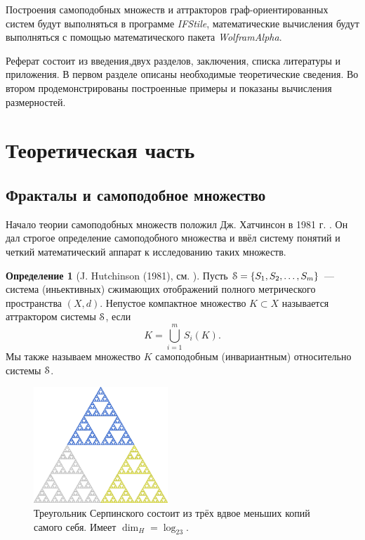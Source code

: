 \documentclass[a4paper,14pt]{extarticle} %
\newcommand{\eS}{\EuScript{S}}
\newcommand{\IN}{\subset}
\newcommand{\0}{\varnothing}
\newcommand{\8}{\infty}
\theoremstyle{definition}
\newtheorem{definition}[theorem]{Определение}
\begin{document}
Построения самоподобных множеств и аттракторов граф-ори\-ен\-ти\-ро\-ван\-ных систем будут выполняться в программе {\em IFStile\/}, математические вычисления будут выполняться с помощью математического пакета {\em WolframAlpha}.

Реферат состоит из введения,двух разделов, заключения, списка литературы и
приложения.
В первом разделе описаны необходимые теоретические сведения.
Во втором продемонстрированы построенные примеры и показаны вычисления размерностей.


\newpage
\section{Теоретическая часть}

\subsection{Фракталы и самоподобное множество}

Начало теории самоподобных множеств положил Дж. Хатчинсон в 1981 г. \cite{Hut1981}.
Он дал строгое определение самоподобного множества и ввёл систему понятий и четкий математический аппарат к исследованию таких множеств. 

\begin{definition}[J. Hutchinson (1981), см. {\cite{Hut1981}}]\label{dfn:sss}
Пусть $\eS=\{S_1, S_2, \ldots, S_m\}$ ---  система (иньективных) сжимающих отображений полного метрического пространства $(X, d)$.
Непустое компактное множество $K\IN X$ называется аттрактором системы $\eS$, если 
$$K = \bigcup \limits_{i=1}^m S_i (K).$$
Мы также называем множество $K$ самоподобным (инвариантным) относительно системы $\eS$.
\end{definition} 

\begin{figure}[H]
\centering
\includegraphics[width=0.45\textwidth]{Triangle_Serp.png}
\begin{minipage}{0.85\textwidth}
\caption{Треугольник Серпинского состоит из трёх вдвое меньших копий самого себя. Имеет $\dim_H=\log_23$.}
\label{fig:serptr}
\end{minipage}
\end{figure}
\end{document}
